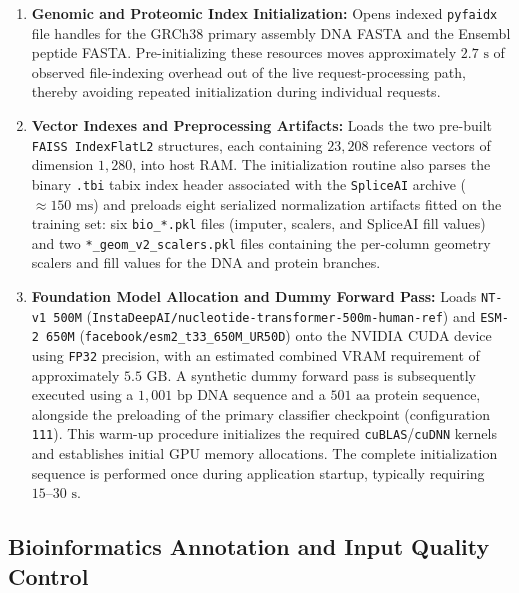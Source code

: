 \begin{enumerate}
    \item \textbf{Genomic and Proteomic Index Initialization:} Opens indexed \texttt{pyfaidx} file handles for the GRCh38 primary assembly DNA FASTA and the Ensembl peptide FASTA. Pre-initializing these resources moves approximately $2.7\text{ s}$ of observed file-indexing overhead out of the live request-processing path, thereby avoiding repeated initialization during individual requests.

    \item \textbf{Vector Indexes and Preprocessing Artifacts:} Loads the two pre-built \texttt{FAISS IndexFlatL2} structures, each containing $23{,}208$ reference vectors of dimension $1{,}280$, into host RAM. The initialization routine also parses the binary \texttt{.tbi} tabix index header associated with the \texttt{SpliceAI} archive ($\approx 150\text{ ms}$) and preloads eight serialized normalization artifacts fitted on the training set: six \texttt{bio\_*.pkl} files (imputer, scalers, and SpliceAI fill values) and two \texttt{*\_geom\_v2\_scalers.pkl} files containing the per-column geometry scalers and fill values for the DNA and protein branches.

    \item \textbf{Foundation Model Allocation and Dummy Forward Pass:} Loads \texttt{NT-v1 500M} (\texttt{InstaDeepAI/nucleotide-transformer-500m-human-ref}) and \texttt{ESM-2 650M} (\texttt{facebook/esm2\_t33\_650M\_UR50D}) onto the NVIDIA CUDA device using \texttt{FP32} precision, with an estimated combined VRAM requirement of approximately $5.5\text{ GB}$. %
    A synthetic dummy forward pass is subsequently executed using a $1{,}001\text{ bp}$ DNA sequence and a $501\text{ aa}$ protein sequence, alongside the preloading of the primary classifier checkpoint (configuration \texttt{111}). This warm-up procedure initializes the required \texttt{cuBLAS}/\texttt{cuDNN} kernels and establishes initial GPU memory allocations. The complete initialization sequence is performed once during application startup, typically requiring $15\text{--}30\text{ s}$.
\end{enumerate}

\subsection{Bioinformatics Annotation and Input Quality Control}

